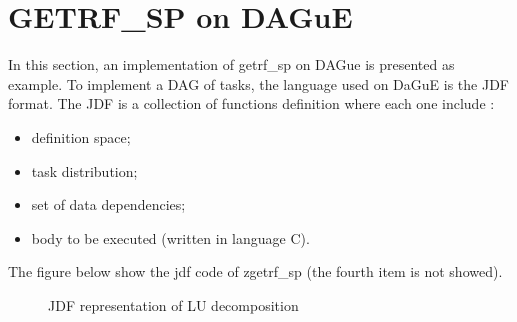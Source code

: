 \documentclass{report}
\begin{document}
\section{GETRF\_SP on DAGuE}
In this section, an implementation of getrf\_sp on DAGue is presented as example. To implement a DAG of tasks, the language used on DaGuE is the JDF format. The JDF is a collection of functions definition where each one include :
\begin{itemize}
\item definition space;
\item task distribution;
\item set of data dependencies;
\item body to be executed (written in language C).
\end{itemize}
The figure below show the jdf code of zgetrf\_sp (the fourth item is not showed).
\begin{figure}[!h]
{\scriptsize} 
\caption{JDF representation of LU decomposition}
\end{figure}
\end{document}
